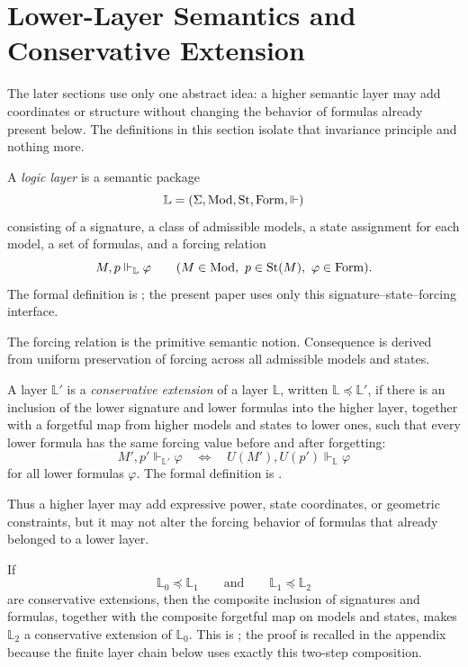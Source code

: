\section{Lower-Layer Semantics and Conservative Extension}\label{sec:preliminaries}

The later sections use only one abstract idea: a higher semantic layer may add coordinates or structure without changing the behavior of formulas already present below. The definitions in this section isolate that invariance principle and nothing more.

\begin{definition}\label{def:logic-layer}
A \emph{logic layer} is a semantic package
\[
\mathbb L=(\Sigma,\mathrm{Mod},\mathrm{St},\mathrm{Form},\Vdash)
\]
consisting of a signature, a class of admissible models, a state assignment for
each model, a set of formulas, and a forcing relation
\[
M,p\Vdash_{\mathbb L}\varphi
\qquad (M\in\mathrm{Mod},\ p\in\mathrm{St}(M),\ \varphi\in\mathrm{Form}).
\]
The formal definition is \cite[Definition~2.1]{HomologicalVisibilityGluingObstructions2026};
the present paper uses only this signature--state--forcing interface.
\end{definition}

The forcing relation is the primitive semantic notion. Consequence is derived from uniform preservation of forcing across all admissible models and states.

\begin{definition}\label{def:conservative-extension}
A layer $\mathbb L'\!$ is a \emph{conservative extension} of a layer
$\mathbb L$, written $\mathbb L\preceq\mathbb L'$, if there is an inclusion of
the lower signature and lower formulas into the higher layer, together with a
forgetful map from higher models and states to lower ones, such that every
lower formula has the same forcing value before and after forgetting:
\[
M',p'\Vdash_{\mathbb L'}\varphi
\quad\Longleftrightarrow\quad
U(M'),U(p')\Vdash_{\mathbb L}\varphi
\]
for all lower formulas $\varphi$. The formal definition is
\cite[Definition~2.2]{HomologicalVisibilityGluingObstructions2026}.
\end{definition}

Thus a higher layer may add expressive power, state coordinates, or geometric constraints, but it may not alter the forcing behavior of formulas that already belonged to a lower layer.

\begin{proposition}\label{prop:conservative-composition}
If
\[
\mathbb L_0\preceq \mathbb L_1
\qquad\text{and}\qquad
\mathbb L_1\preceq \mathbb L_2
\]
are conservative extensions, then the composite inclusion of signatures and
formulas, together with the composite forgetful map on models and states, makes
$\mathbb L_2$ a conservative extension of $\mathbb L_0$. This is
\cite[Proposition~2.3]{HomologicalVisibilityGluingObstructions2026}; the proof
is recalled in the appendix because the finite layer chain below uses exactly
this two-step composition.
\end{proposition}

